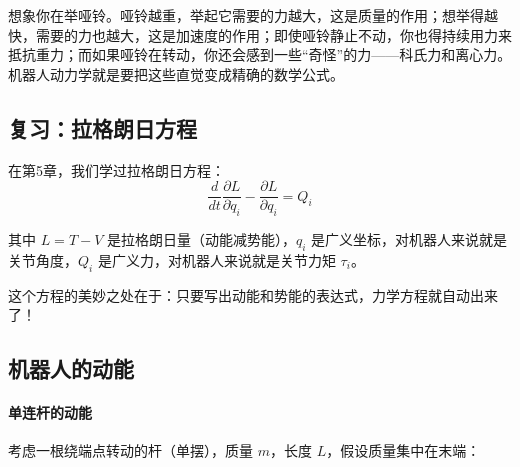 \begin{example}[直觉理解]
想象你在举哑铃。哑铃越重，举起它需要的力越大，这是质量的作用；想举得越快，需要的力也越大，这是加速度的作用；即使哑铃静止不动，你也得持续用力来抵抗重力；而如果哑铃在转动，你还会感到一些“奇怪”的力——科氏力和离心力。机器人动力学就是要把这些直觉变成精确的数学公式。
\end{example}

\subsection{复习：拉格朗日方程}

在第5章，我们学过拉格朗日方程：
\begin{equation}
\frac{d}{dt}\frac{\partial L}{\partial \dot{q}_i} - \frac{\partial L}{\partial q_i} = Q_i
\end{equation}

其中 $L = T - V$ 是拉格朗日量（动能减势能），$q_i$ 是广义坐标，对机器人来说就是关节角度，$Q_i$ 是广义力，对机器人来说就是关节力矩 $\tau_i$。

这个方程的美妙之处在于：只要写出动能和势能的表达式，力学方程就自动出来了！

\subsection{机器人的动能}

\paragraph{单连杆的动能}

考虑一根绕端点转动的杆（单摆），质量 $m$，长度 $L$，假设质量集中在末端：

